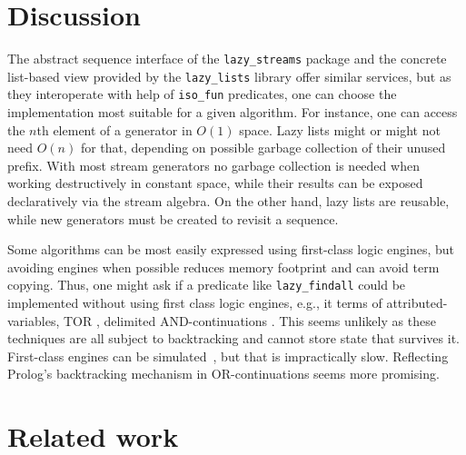 \documentclass{new_tlp}
\begin{document}
\section{Discussion}\label{disc}

The abstract sequence interface of the {\tt lazy\_streams} package and
the concrete list-based view provided by the {\tt lazy\_lists} library offer
similar services, but as they interoperate with help of {\tt iso\_fun} predicates,
one can choose the  implementation most suitable for a given algorithm.
For instance, one can access the $n$th element of a generator in $O(1)$ space.
Lazy lists might or might not need $O(n)$ for that, depending on possible garbage collection of their unused prefix.
With most stream generators no garbage collection is needed when working destructively in constant space, while their results can be exposed declaratively via the stream algebra.
On the other hand, lazy lists are reusable, while new generators 
must be created to revisit a sequence.

Some algorithms can be most easily expressed using first-class logic engines, but
avoiding engines when possible reduces memory footprint and can avoid term copying.
Thus, one might ask if a predicate like {\tt lazy\_findall} could be implemented
without using first class logic engines, e.g., it terms of  
attributed-variables, 
TOR \cite{tor}, delimited AND-continuations \cite{delim}.
This seems unlikely as  these techniques are all subject to backtracking and cannot
store state that survives it. First-class engines can be simulated~\cite{padl09inter}, but that is 
impractically slow. Reflecting Prolog's backtracking mechanism in OR-continuations seems more promising.

\section{Related work}\label{rel}

\begin{comment}
Maybe?
\BI 
\I some history - see
\cite{tarau:parimp99,tarau:cl2000,iclp08:inter,ciclops08:pINTER}
\cite{coord11tarau}
\cite{bp2011}
\I work on delimited continuations \cite{delim}, hookable disjunction \cite{tor}
\I work on pipelines \cite{pipelines}
\EI
\end{comment}
\end{document}
